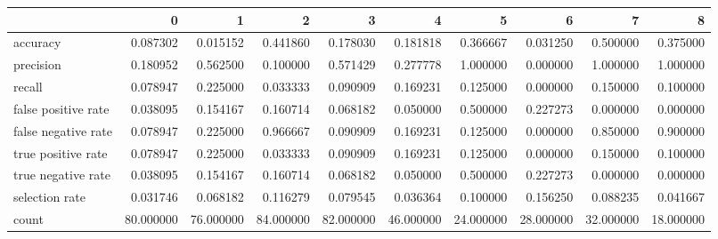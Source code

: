 \begin{tabular}{lrrrrrrrrr}
\toprule
{} &          0 &          1 &          2 &          3 &          4 &          5 &          6 &          7 &          8 \\
\midrule
accuracy            &   0.087302 &   0.015152 &   0.441860 &   0.178030 &   0.181818 &   0.366667 &   0.031250 &   0.500000 &   0.375000 \\
precision           &   0.180952 &   0.562500 &   0.100000 &   0.571429 &   0.277778 &   1.000000 &   0.000000 &   1.000000 &   1.000000 \\
recall              &   0.078947 &   0.225000 &   0.033333 &   0.090909 &   0.169231 &   0.125000 &   0.000000 &   0.150000 &   0.100000 \\
false positive rate &   0.038095 &   0.154167 &   0.160714 &   0.068182 &   0.050000 &   0.500000 &   0.227273 &   0.000000 &   0.000000 \\
false negative rate &   0.078947 &   0.225000 &   0.966667 &   0.090909 &   0.169231 &   0.125000 &   0.000000 &   0.850000 &   0.900000 \\
true positive rate  &   0.078947 &   0.225000 &   0.033333 &   0.090909 &   0.169231 &   0.125000 &   0.000000 &   0.150000 &   0.100000 \\
true negative rate  &   0.038095 &   0.154167 &   0.160714 &   0.068182 &   0.050000 &   0.500000 &   0.227273 &   0.000000 &   0.000000 \\
selection rate      &   0.031746 &   0.068182 &   0.116279 &   0.079545 &   0.036364 &   0.100000 &   0.156250 &   0.088235 &   0.041667 \\
count               &  80.000000 &  76.000000 &  84.000000 &  82.000000 &  46.000000 &  24.000000 &  28.000000 &  32.000000 &  18.000000 \\
\bottomrule
\end{tabular}
